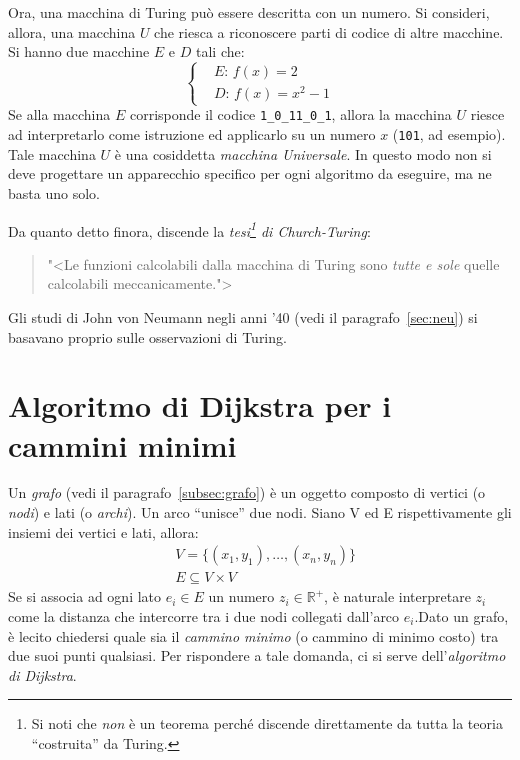 Ora, una macchina di Turing può essere descritta con un numero. Si consideri, allora, una macchina $U$ che riesca a riconoscere parti di codice di altre macchine. Si hanno due macchine $E$ e $D$ tali che:
\[
\left\{
	\begin{aligned}
&E:\,f(x)=2 		\\
&D:\,f(x)=x^2-1
	\end{aligned}
\right.
\]
Se alla macchina $E$ corrisponde il codice \lstinline!1_0_11_0_1!, allora la macchina $U$ riesce ad interpretarlo come istruzione ed applicarlo su un numero $x$ (\lstinline!101!, ad esempio). Tale macchina $U$ è una cosiddetta \emph{macchina Universale}. In questo modo non si deve progettare un apparecchio specifico per ogni algoritmo da eseguire, ma ne basta uno solo. 

Da  quanto detto finora, discende la \emph{tesi\footnote{Si noti che \emph{non} è un teorema perché discende direttamente da tutta la teoria ``costruita'' da Turing.} di Church-Turing}:
\begin{quotation}
"<Le funzioni calcolabili dalla macchina di Turing sono \emph{tutte e sole} quelle calcolabili meccanicamente.">
\end{quotation}
Gli studi di John von Neumann negli anni '40 (vedi il paragrafo~\vref{sec:neu}) si basavano proprio sulle osservazioni di Turing.

	\section{Algoritmo di Dijkstra per i cammini minimi}
Un \emph{grafo} (vedi il paragrafo~\vref{subsec:grafo}) è un oggetto composto di vertici (o \emph{nodi}) e lati (o \emph{archi}). Un arco ``unisce'' due nodi. Siano V ed E rispettivamente gli insiemi dei vertici e lati, allora:
\[
\begin{split}
&V=\{(x_1,y_1),\dots,(x_n,y_n)\} \\
&E\subseteq V\times V
\end{split}
\]
Se si associa ad ogni lato $e_{i}\in E$ un numero $z_i\in\mathbb{R^{+}}$, è naturale interpretare $z_i$ come la distanza che intercorre tra i due nodi collegati dall'arco $e_i$.Dato un grafo, è lecito chiedersi quale sia il \emph{cammino minimo} (o cammino di minimo costo) tra due suoi punti qualsiasi. Per rispondere a tale domanda, ci si serve dell'{\em algoritmo di Dijkstra}.

